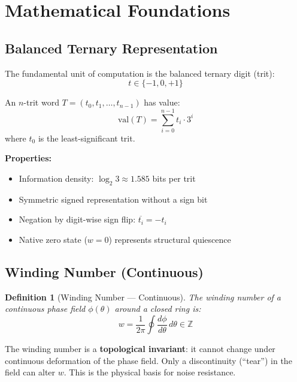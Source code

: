 \documentclass[11pt, a4paper]{article}
\newtheorem{definition}{Definition}[section]
\begin{document}
\section{Mathematical Foundations}

\subsection{Balanced Ternary Representation}

The fundamental unit of computation is the balanced ternary digit (trit):
\begin{equation}
  t \in \{-1, 0, +1\}
\end{equation}

An $n$-trit word $T = (t_0, t_1, \ldots, t_{n-1})$ has value:
\begin{equation}
  \text{val}(T) = \sum_{i=0}^{n-1} t_i \cdot 3^i
  \label{eq:trit-value}
\end{equation}
where $t_0$ is the least-significant trit.

\textbf{Properties:}
\begin{itemize}[nosep]
  \item Information density: $\log_2 3 \approx 1.585$ bits per trit
  \item Symmetric signed representation without a sign bit
  \item Negation by digit-wise sign flip: $\overline{t_i} = -t_i$
  \item Native zero state ($w = 0$) represents structural quiescence
\end{itemize}

\subsection{Winding Number (Continuous)}

\begin{definition}[Winding Number --- Continuous]
The winding number of a continuous phase field $\phi(\theta)$ around a closed
ring is:
\begin{equation}
  w = \frac{1}{2\pi} \oint \frac{d\phi}{d\theta}\, d\theta \in \mathbb{Z}
  \label{eq:winding-continuous}
\end{equation}
\end{definition}

The winding number is a \textbf{topological invariant}: it cannot change under
continuous deformation of the phase field. Only a discontinuity (``tear'')
in the field can alter $w$. This is the physical basis for noise resistance.
\end{document}
